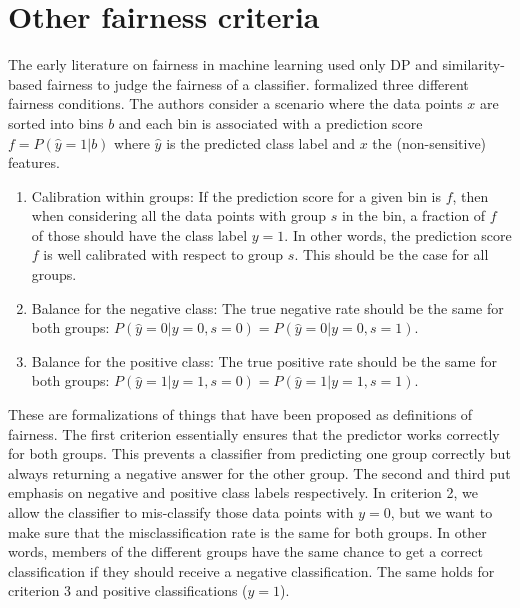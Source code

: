 \section{Other fairness criteria}%
\label{improved-definitions-of-fairness}
The early literature on fairness in machine learning used only \ac{DP}
and similarity-based fairness to judge the fairness of a classifier.
\citet{kleinberg2016inherent} formalized three different fairness conditions.
The authors consider a scenario where the data points \(x\) are sorted into bins \(b\)
and each bin is associated with a prediction score \(f = P(\hat{y}=1|b)\)
where \(\hat{y}\) is the predicted class label and \(x\) the (non-sensitive) features.
\begin{enumerate}
\item
  Calibration within groups:
  If the prediction score for a given bin is \(f\),
  then when considering all the data points with group \(s\) in the bin,
  a fraction of \(f\) of those should have the class label \(y=1\).
  In other words, the prediction score \(f\) is well calibrated with respect to group \(s\).
  This should be the case for all groups.
\item
  Balance for the negative class:
  The true negative rate should be the same for both groups: \(P(\hat{y}=0|y=0,s=0) = P(\hat{y}=0|y=0,s=1)\).
\item
  Balance for the positive class:
  The true positive rate should be the same for both groups: \(P(\hat{y}=1|y=1,s=0) = P(\hat{y}=1|y=1,s=1)\).
\end{enumerate}
These are formalizations of things that have been proposed as definitions of fairness.
The first criterion essentially ensures that the predictor works correctly for both groups.
This prevents a classifier from predicting one group correctly
but always returning a negative answer for the other group.
The second and third put emphasis on negative and positive class labels respectively.
In criterion 2, we allow the classifier to mis-classify those data points with \(y=0\),
but we want to make sure that the misclassification rate is the same for both groups.
In other words, members of the different groups have the same chance
to get a correct classification if they should receive a negative classification.
The same holds for criterion 3 and positive classifications (\(y=1\)).

